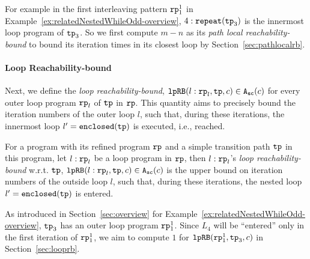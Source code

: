 For example in the first interleaving pattern $\mathtt{rp}_1^1$ in Example~\ref{ex:relatedNestedWhileOdd-overview}, 
$4:\mathtt{repeat}(\mathtt{tp}_3)$ is the innermost loop program of $\mathtt{tp}_3$. So we first compute $m - n$ as its \emph{path local reachability-bound} to bound its iteration times in its closest loop by Section~\ref{sec:pathlocalrb}.

\paragraph{Loop Reachability-bound}
Next, we define the \emph{loop reachability-bound},
$\mathtt{lpRB}(l: \mathtt{rp}_l, \mathtt{tp}, c) \in {\ensuremath{\mathtt{A_{sc}}}}(c)$ for every outer loop program $\mathtt{rp}_l$ of $\mathtt{tp}$ in $\mathtt{rp}$. This quantity aims to precisely bound the iteration numbers of the outer loop $l$,
such that,
during these iterations, the innermost loop $l' = \mathtt{enclosed(\mathtt{tp})}$ is executed, i.e., reached.
\begin{defn}
For a program with its refined program $\mathtt{rp}$ and a simple transition path $\mathtt{tp}$ in this program, 
let $l: \mathtt{rp}_l$ be a loop program in $\mathtt{rp}$,
then $l: \mathtt{rp}_l$'s \emph{loop reachability-bound} w.r.t. $\mathtt{tp}$,  $\mathtt{lpRB}(l: \mathtt{rp}_l, \mathtt{tp}, c) \in {\ensuremath{\mathtt{A_{sc}}}}(c)$
is the upper bound on iteration numbers of the outside loop $l$,
such that,
during these iterations, the nested loop $l' = \mathtt{enclosed(\mathtt{tp})}$ is entered.
\end{defn}
As introduced in Section~\ref{sec:overview} for Example~\ref{ex:relatedNestedWhileOdd-overview}, $\mathtt{tp}_3$ has an outer loop program $\mathtt{rp}_1^1$. Since $L_4$ will be ``entered'' only in the first iteration of $\mathtt{rp}_1^1$,
we aim to compute $1$ for $\mathtt{lpRB}(\mathtt{rp}_1^1, \mathtt{tp}_3, c)$ in Section~\ref{sec:looprb}.

